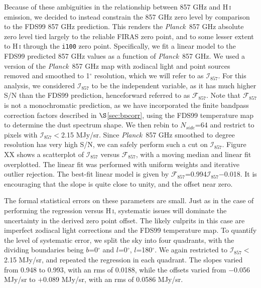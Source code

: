 \documentclass{emulateapj}
\newcommand{\PLANCK}{{\it Planck}}
\begin{document}
Because of these ambiguities in the relationship between 857 GHz and 
H\,\textsc{i} emission, we decided to instead constrain the 857 GHz zero level
by comparison to the FDS99 857 GHz prediction. This renders the \PLANCK~857 GHz
absolute zero level tied largely to the reliable FIRAS zero point, and to some 
lesser extent to H\,\textsc{i} through the \verb|i100| zero point. 
Specifically, we fit a linear model to the FDS99 predicted 857 GHz values as a 
function of \PLANCK~857 GHz. We used a version of the \PLANCK~857 GHz map with 
zodiacal light and point sources removed and smoothed to 1$^{\circ}$ 
resolution, which we will refer to as $\mathcal{I}_{857}$. For this analysis, 
we considered $\mathcal{I}_{857}$ to be the independent variable, as it has 
much higher S/N than the FDS99 prediction, henceforward referred to as 
$\mathcal{F}_{857}$. Note that $\mathcal{F}_{857}$ is not a monochromatic 
prediction, as we have incorporated the finite bandpass correction factors 
described in $\S$\ref{sec:bpcorr}, using the FDS99 temperature map to determine
the dust spectrum shape. We then rebin to $N_{side}$=64 and restrict to pixels 
with $\mathcal{I}_{857}$$<$2.15 MJy/sr. Since \PLANCK~857 GHz smoothed to 
degree resolution has very high S/N, we can safely perform such a cut on 
$\mathcal{I}_{857}$. Figure XX shows a scatterplot of 
$\mathcal{I}_{857}$ versus $\mathcal{F}_{857}$, with a moving median and linear
fit overplotted. The linear fit was performed with uniform weights and 
iterative outlier rejection. The best-fit linear model is given by 
$\mathcal{F}_{857}$=0.994$\mathcal{I}_{857}$$-$0.018. It is encouraging that 
the slope is quite close to unity, and the offset near zero.

The formal statistical errors on these parameters are small. Just as in the 
case of performing the regression versus  H\,\textsc{i}, 
systematic issues will dominate the uncertainty in the derived zero point
offset. The likely culprits in this case are imperfect zodiacal light 
corrections and the FDS99 temperature map. To quantify the level of systematic
error, we split the sky into four quadrants, with the dividing boundaries
being $b$=0$^{\circ}$ and $l$=0$^{\circ}$, $l$=180$^{\circ}$. We again
restricted to $\mathcal{I}_{857}$$<$2.15 MJy/sr, and repeated the 
regression in each quadrant. The slopes varied from 0.948 to 0.993, with an
rms of 0.0188, while the offsets varied from $-$0.056 MJy/sr to $+$0.089 
MJy/sr, with an rms of 0.0586 MJy/sr.

\end{document}
